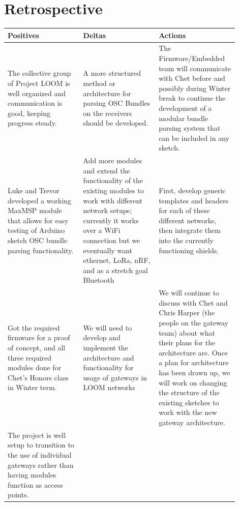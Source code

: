 \documentclass[onecolumn, draftclsnofoot,10pt, compsoc]{IEEEtran}
\begin{document}
\section{Retrospective}

\begin{center}
\begin{longtable}{|p{0.3\linewidth}|p{0.3\linewidth}|p{0.3\linewidth}|} 

 \hline
 \textbf{Positives} & \textbf{Deltas} & \textbf{Actions} \\ 
 \hline
 The collective group of Project LOOM is well organized and communication is good, keeping progress steady. & A more structured method or architecture for parsing OSC Bundles on the receivers should be developed. & The Firmware/Embedded team will communicate with Chet before and possibly during Winter break to continue the development of a modular bundle parsing system that can be included in any sketch.  \\ 
 \hline
 Luke and Trevor developed a working MaxMSP module that allows for easy testing of Arduino sketch OSC bundle parsing functionality. & Add more modules and extend the functionality of the existing modules to work with different network setups; currently it works over a WiFi connection but we eventually want ethernet, LoRa, nRF, and as a stretch goal Bluetooth & First, develop generic templates and headers for each of these different networks, then integrate them into the currently functioning shields. \\ 
 \hline
 Got the required firmware for a proof of concept, and all three required modules done for Chet’s Honors class in Winter term. & We will need to develop and implement the architecture and functionality for usage of gateways in LOOM networks & We will continue to discuss with Chet and Chris Harper (the people on the gateway team) about what their plans for the architecture are. Once a plan for architecture has been drawn up, we will work on changing the structure of the existing sketches to work with the new gateway architecture. \\ 
 \hline
 The project is well setup to transition to the use of individual gateways rather than having modules function as access points. &  &  \\ 
 \hline
\end{longtable}
\end{center}

% 
% 
\end{document}
